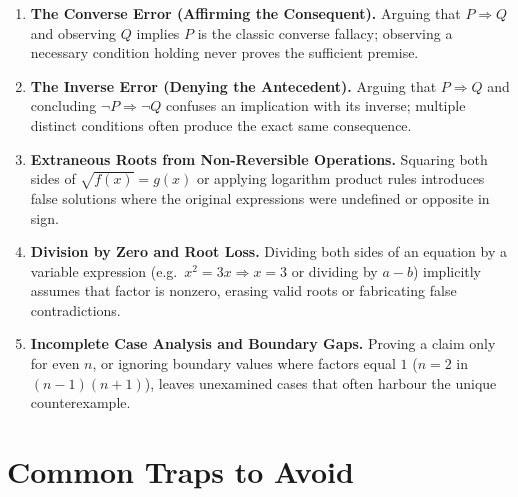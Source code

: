\documentclass[11pt,a4paper]{article}
\begin{document}
\begin{enumerate}[leftmargin=2em, itemsep=4pt]
  \item \textbf{The Converse Error (Affirming the Consequent).}
        Arguing that $P\Rightarrow Q$ and observing $Q$ implies $P$ is the classic converse fallacy; observing a necessary condition holding never proves the sufficient premise. 
  \item \textbf{The Inverse Error (Denying the Antecedent).}
        Arguing that $P\Rightarrow Q$ and concluding $\neg P\Rightarrow\neg Q$ confuses an implication with its inverse; multiple distinct conditions often produce the exact same consequence. 
  \item \textbf{Extraneous Roots from Non-Reversible Operations.}
        Squaring both sides of $\sqrt{f(x)}=g(x)$ or applying logarithm product rules introduces false solutions where the original expressions were undefined or opposite in sign. 
  \item \textbf{Division by Zero and Root Loss.}
        Dividing both sides of an equation by a variable expression (e.g.\ $x^2=3x\Rightarrow x=3$ or dividing by $a-b$) implicitly assumes that factor is nonzero, erasing valid roots or fabricating false contradictions. 
  \item \textbf{Incomplete Case Analysis and Boundary Gaps.}
        Proving a claim only for even $n$, or ignoring boundary values where factors equal $1$ ($n=2$ in $(n-1)(n+1)$), leaves unexamined cases that often harbour the unique counterexample. 
\end{enumerate}

\section*{Common Traps to Avoid}
\end{document}
